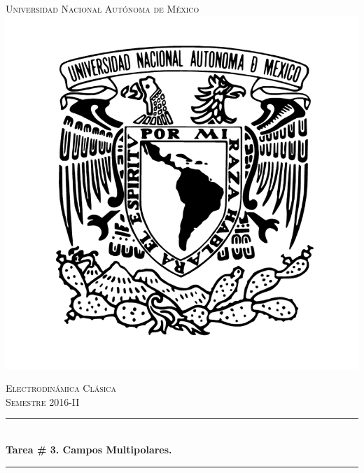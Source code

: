 \documentclass[a4paper,11pt]{article}
\numberwithin{equation}{section}
\begin{document}
\begin{titlepage}

\newcommand{\HRule}{\rule{\linewidth}{0.5mm}} %

\center %
 

\textsc{\LARGE Universidad Nacional Autónoma de México}\\[0.3cm] %

\includegraphics[scale=0.17]{unam}

\textsc{\Large Electrodinámica Clásica}\\[0.5cm] %
\textsc{\large Semestre 2016-II}\\[0.5cm] %


\HRule \\[0.4cm]
{ \huge \bfseries Tarea \# 3. Campos Multipolares.}\\[0.2cm] %
\HRule \\[1cm]
 

\end{titlepage}
\end{document}
